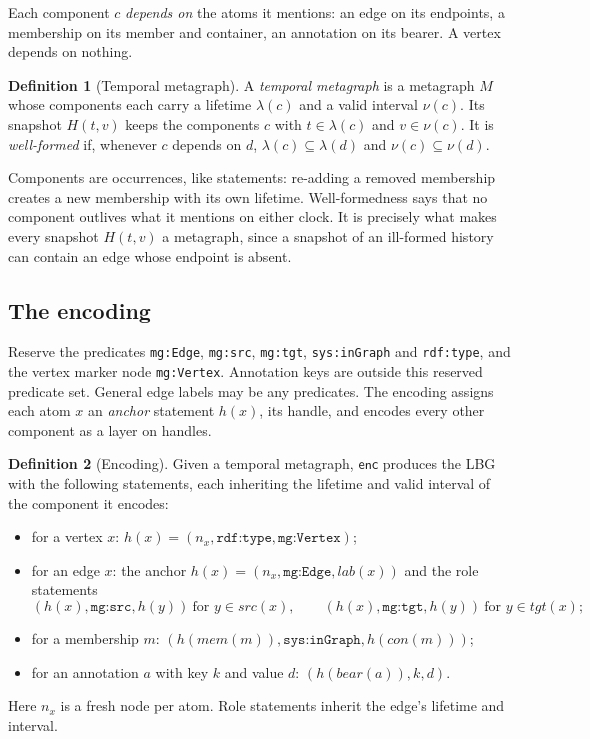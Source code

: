 \documentclass[11pt]{article}
\theoremstyle{plain}
\theoremstyle{definition}
\newtheorem{definition}{Definition}
\theoremstyle{remark}
\newcommand{\life}{\lambda}              %
\newcommand{\valid}{\nu}                 %
\newcommand{\enc}{\mathsf{enc}}
\newcommand{\sys}[1]{\texttt{sys:#1}}
\newcommand{\mg}[1]{\texttt{mg:#1}}
\newcommand{\iri}[1]{\texttt{#1}}
\begin{document}
Each component $c$ \emph{depends on} the atoms it mentions: an edge on its
endpoints, a membership on its member and container, an annotation on its
bearer. A vertex depends on nothing.

\begin{definition}[Temporal metagraph]
A \emph{temporal metagraph} is a metagraph $M$ whose components each carry a
lifetime $\life(c)$ and a valid interval $\valid(c)$. Its snapshot $H(t,v)$ keeps
the components $c$ with $t\in\life(c)$ and $v\in\valid(c)$. It is
\emph{well-formed} if, whenever $c$ depends on $d$,
$\life(c)\subseteq\life(d)$ and $\valid(c)\subseteq\valid(d)$.
\end{definition}

Components are occurrences, like statements: re-adding a removed membership
creates a new membership with its own lifetime. Well-formedness says that no
component outlives what it mentions on either clock. It is precisely what makes
every snapshot $H(t,v)$ a metagraph, since a snapshot of an ill-formed history can
contain an edge whose endpoint is absent.

\subsection{The encoding}

Reserve the predicates \mg{Edge}, \mg{src}, \mg{tgt}, \sys{inGraph} and
\iri{rdf:type}, and the vertex marker node \mg{Vertex}. Annotation keys are
outside this reserved predicate set. General edge labels may be any predicates. The encoding assigns each atom $x$ an \emph{anchor} statement
$h(x)$, its handle, and encodes every other component as a layer on handles.

\begin{definition}[Encoding]\label{def:enc}
Given a temporal metagraph, $\enc$ produces the LBG with the following statements,
each inheriting the lifetime and valid interval of the component it encodes:
\begin{itemize}
\item for a vertex $x$: $h(x)=(n_x,\iri{rdf:type},\mg{Vertex})$;
\item for an edge $x$: the anchor $h(x)=(n_x,\mg{Edge},\mathit{lab}(x))$ and the role statements
  \[(h(x),\mg{src},h(y))\ \text{for } y\in\mathit{src}(x),\qquad(h(x),\mg{tgt},h(y))\ \text{for } y\in\mathit{tgt}(x);\]
\item for a membership $m$: $(h(\mathit{mem}(m)),\sys{inGraph},h(\mathit{con}(m)))$;
\item for an annotation $a$ with key $k$ and value $d$: $(h(\mathit{bear}(a)),k,d)$.
\end{itemize}
Here $n_x$ is a fresh node per atom. Role statements inherit the edge's lifetime
and interval.
\end{definition}
\end{document}
